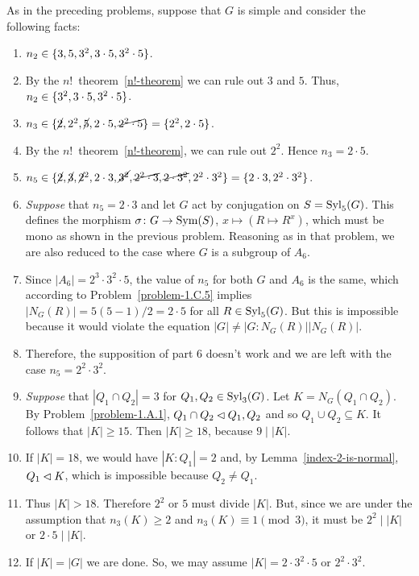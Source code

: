 \begin{solution} As in the preceding problems, suppose that $G$ is simple and consider the following facts:
\begin{enumerate}[\rm1.]
    \item $n_2\in\{3, 5, 3^2, 3\cdot5, 3^2\cdot 5\}$.
    \item By the $n!$~theorem~\ref{n!-theorem} we can rule out $3$ and $5$. Thus, $n_2\in\{3^2,3\cdot5,3^2\cdot5\}$.
    \item $n_3\in\{\cancel2,2^2, \cancel5, 2\cdot 5, \cancel{2^2\cdot5}\}=\{2^2,2\cdot5\}$.
    \item By the $n!$~theorem~\ref{n!-theorem}, we can rule out $2^2$. Hence $n_3=2\cdot5$.
    \item $n_5\in\{\cancel2, \cancel3, \cancel2^2, 2\cdot3, \cancel{3^2}, \cancel{2^2\cdot3}, \cancel{2\cdot3^2}, 2^2\cdot3^2\} = \{2\cdot3,2^2\cdot3^2\}$.
    \item {\it Suppose} that $n_5=2\cdot3$ and let $G$ act by conjugation on $S={\rm Syl}_5(G)$. This defines the morphism $\sigma\colon G\to{\rm Sym}(S)$, $x\mapsto(R\mapsto R^x)$, which must be mono as shown in the previous problem. Reasoning as in that problem, we are also reduced to the case where $G$ is a subgroup of $A_6$. 
    \item Since $|A_6|=2^3\cdot3^2\cdot5$, the value of $n_5$ for both $G$ and $A_6$ is the same, which according to Problem~\ref{problem-1.C.5} implies $|N_G(R)|=5(5-1)/2=2\cdot5$ for all $R\in{\rm Syl}_5(G)$. But this is impossible because it would violate the equation $|G|\ne|G:N_G(R)||N_G(R)|$.
    \item Therefore, the supposition of part 6 doesn't work and we are left with the case $n_5=2^2\cdot3^2$.
    \item {\it Suppose\/} that $|Q_1\cap Q_2|=3$ for $Q_1,Q_2\in{\rm Syl}_3(G)$. Let $K=N_G(Q_1\cap Q_2)$. By Problem~\ref{problem-1.A.1}, $Q_1\cap Q_2\lhd Q_1,Q_2$ and so $Q_1\cup Q_2\subseteq K$. It follows that $|K|\ge15$. Then $|K|\ge18$, because $9\mid|K|$.
    \item If $|K|=18$, we would have $|K:Q_1|=2$ and, by Lemma~\ref{index-2-is-normal}, $Q_1\lhd K$, which is impossible because $Q_2\ne Q_1$.
    \item Thus $|K|>18$. Therefore $2^2$ or $5$ must divide $|K|$. But, since we are under the assumption that $n_3(K)\ge2$ and $n_3(K)\equiv1\pmod3$, it must be $2^2\mid|K|$ or $2\cdot5\mid|K|$.
    \item If $|K|=|G|$ we are done. So, we may assume $|K|=2\cdot3^2\cdot5$ or $2^2\cdot3^2$.

\end{enumerate}
\end{solution}
